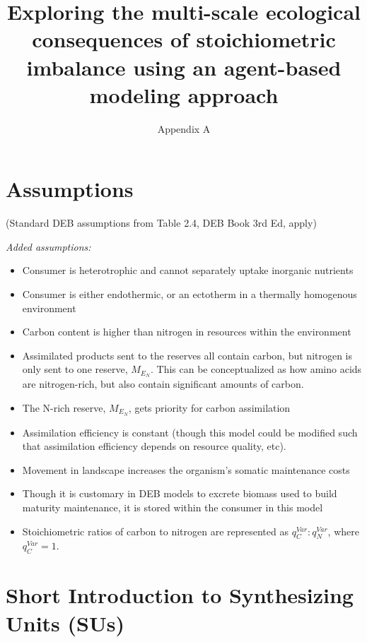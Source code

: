 \documentclass[
]{article}
\title{Exploring the multi-scale ecological consequences of
stoichiometric imbalance using an agent-based modeling approach}
\subtitle{Appendix A}
\author{}
\date{\vspace{-2.5em}}
\providecommand{\tightlist}{%
  \setlength{\itemsep}{0pt}\setlength{\parskip}{0pt}}
\begin{document}
\maketitle

\section{Assumptions}\label{assumptions}

(Standard DEB assumptions from Table 2.4, DEB Book 3rd Ed, apply)

\emph{Added assumptions:}

\begin{itemize}
\tightlist
\item
  Consumer is heterotrophic and cannot separately uptake inorganic
  nutrients
\item
  Consumer is either endothermic, or an ectotherm in a thermally
  homogenous environment
\item
  Carbon content is higher than nitrogen in resources within the
  environment
\item
  Assimilated products sent to the reserves all contain carbon, but
  nitrogen is only sent to one reserve, \(M_{E_N}\). This can be
  conceptualized as how amino acids are nitrogen-rich, but also contain
  significant amounts of carbon.
\item
  The N-rich reserve, \(M_{E_N}\), gets priority for carbon assimilation
\item
  Assimilation efficiency is constant (though this model could be
  modified such that assimilation efficiency depends on resource
  quality, etc).
\item
  Movement in landscape increases the organism's somatic maintenance
  costs
\item
  Though it is customary in DEB models to excrete biomass used to build
  maturity maintenance, it is stored within the consumer in this model
\item
  Stoichiometric ratios of carbon to nitrogen are represented as
  \(q_{C}^{Var}:q_{N}^{Var}\), where \(q_{C}^{Var}=1\).
\end{itemize}

\newpage

\section{Short Introduction to Synthesizing Units
(SUs)}\label{short-introduction-to-synthesizing-units-sus}
\end{document}
